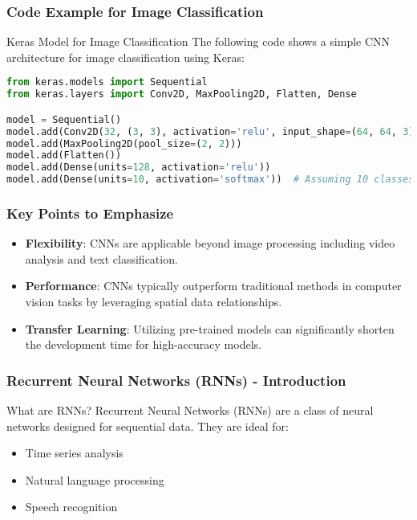 \documentclass[aspectratio=169]{beamer}
\begin{document}
\begin{frame}[fragile]
    \frametitle{Code Example for Image Classification}
    \begin{block}{Keras Model for Image Classification}
        The following code shows a simple CNN architecture for image classification using Keras:
    \end{block}
    
    \begin{lstlisting}[language=Python]
from keras.models import Sequential
from keras.layers import Conv2D, MaxPooling2D, Flatten, Dense

model = Sequential()
model.add(Conv2D(32, (3, 3), activation='relu', input_shape=(64, 64, 3)))
model.add(MaxPooling2D(pool_size=(2, 2)))
model.add(Flatten())
model.add(Dense(units=128, activation='relu'))
model.add(Dense(units=10, activation='softmax'))  # Assuming 10 classes
    \end{lstlisting}
\end{frame}

\begin{frame}[fragile]
    \frametitle{Key Points to Emphasize}
    \begin{itemize}
        \item \textbf{Flexibility}: CNNs are applicable beyond image processing including video analysis and text classification.
        \item \textbf{Performance}: CNNs typically outperform traditional methods in computer vision tasks by leveraging spatial data relationships.
        \item \textbf{Transfer Learning}: Utilizing pre-trained models can significantly shorten the development time for high-accuracy models.
    \end{itemize}
\end{frame}

\begin{frame}[fragile]
    \frametitle{Recurrent Neural Networks (RNNs) - Introduction}
    \begin{block}{What are RNNs?}
        Recurrent Neural Networks (RNNs) are a class of neural networks designed for sequential data.
        They are ideal for:
        \begin{itemize}
            \item Time series analysis
            \item Natural language processing
            \item Speech recognition
        \end{itemize}
    \end{block}
\end{frame}
\end{document}
